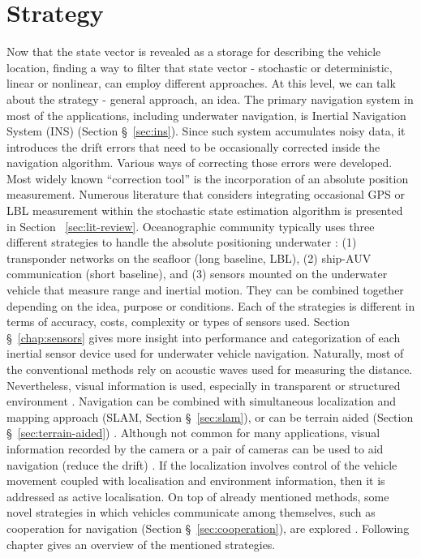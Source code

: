 \section{Strategy} 
Now that the state vector is revealed as a storage for describing the vehicle location, finding a way to filter that state vector - stochastic or deterministic, linear or nonlinear, can employ different approaches. At this level, we can talk about the strategy - general approach, an idea. The primary navigation system in most of the applications, including underwater navigation, is Inertial Navigation System (INS) (Section \S~\ref{sec:ins}). Since such system accumulates noisy data, it introduces the drift errors that need to be occasionally corrected inside the navigation algorithm. Various ways of correcting those errors were developed. Most widely known ``correction tool'' is the incorporation of an absolute position measurement. Numerous literature that considers integrating occasional GPS or LBL measurement within the stochastic state estimation algorithm is presented in Section ~\ref{sec:lit-review}. 
Oceanographic community typically uses three different strategies to handle the absolute positioning underwater \cite{whitcomb99}: (1) transponder networks on the seafloor (long baseline, LBL), (2) ship-AUV communication (short baseline), and (3) sensors mounted on the underwater vehicle that measure range and inertial motion. They can be combined together depending on the idea, purpose or conditions. Each of the strategies is different in terms of accuracy, costs, complexity \cite{eustice05} or types of sensors used. Section \S~\ref{chap:sensors} gives more insight into performance and categorization of each inertial sensor device used for underwater vehicle navigation. Naturally, most of the conventional methods rely on acoustic waves used for measuring the distance. Nevertheless, visual information is used, especially in transparent or structured environment \cite{carreras03}. Navigation can be combined with simultaneous localization and mapping approach (SLAM, Section \S~\ref{sec:slam}), or can be terrain aided (Section \S~\ref{sec:terrain-aided}) \cite{kinsey06}. Although not common for many applications, visual information recorded by the camera or a pair of cameras can be used to aid navigation (reduce the drift) \cite{eustice05large, bahr08}. If the localization involves control of the vehicle movement coupled with localisation and environment information, then it is addressed as active localisation. On top of already mentioned methods, some novel strategies in which vehicles communicate among themselves, such as cooperation for navigation (Section \S~\ref{sec:cooperation}), are explored \cite{bahr08}. Following chapter gives an overview of the mentioned strategies.       

